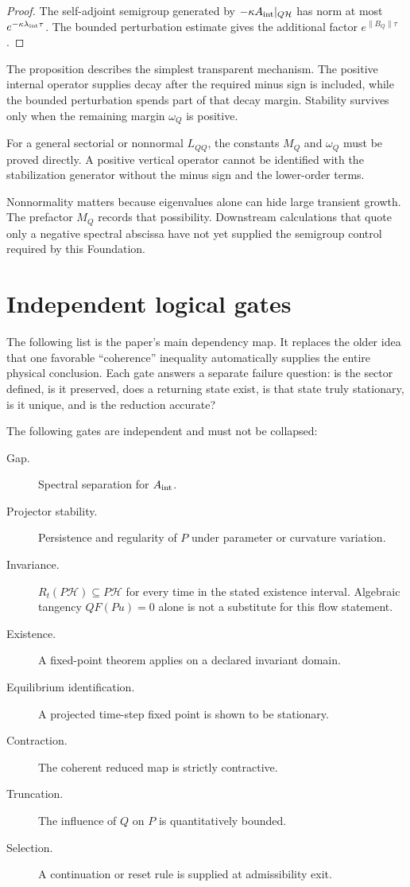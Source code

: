 \documentclass[11pt]{article}
\begin{document}
\begin{proof}
The self-adjoint semigroup generated by
$-\kappa A_{\rm int}|_{Q\mathcal H}$ has norm at most
$e^{-\kappa\lambda_{\rm int}\tau}$. The bounded perturbation estimate gives
the additional factor $e^{\|B_Q\|\tau}$.
\end{proof}

The proposition describes the simplest transparent mechanism. The positive
internal operator supplies decay after the required minus sign is included,
while the bounded perturbation spends part of that decay margin. Stability
survives only when the remaining margin $\omega_Q$ is positive.

For a general sectorial or nonnormal $L_{QQ}$, the constants $M_Q$ and
$\omega_Q$ must be proved directly. A positive vertical operator cannot be
identified with the stabilization generator without the minus sign and the
lower-order terms.

Nonnormality matters because eigenvalues alone can hide large transient
growth. The prefactor $M_Q$ records that possibility. Downstream calculations
that quote only a negative spectral abscissa have not yet supplied the
semigroup control required by this Foundation.

\section{Independent logical gates}

The following list is the paper's main dependency map. It replaces the older
idea that one favorable ``coherence'' inequality automatically supplies the
entire physical conclusion. Each gate answers a separate failure question:
is the sector defined, is it preserved, does a returning state exist, is that
state truly stationary, is it unique, and is the reduction accurate?

The following gates are independent and must not be collapsed:
\begin{description}
\item[Gap.] Spectral separation for $A_{\rm int}$.
\item[Projector stability.] Persistence and regularity of $P$ under parameter
or curvature variation.
\item[Invariance.] $R_t(P\mathcal H)\subseteq P\mathcal H$ for every
time in the stated existence interval. Algebraic tangency $QF(Pu)=0$
alone is not a substitute for this flow statement.
\item[Existence.] A fixed-point theorem applies on a declared invariant domain.
\item[Equilibrium identification.] A projected time-step fixed point is shown
to be stationary.
\item[Contraction.] The coherent reduced map is strictly contractive.
\item[Truncation.] The influence of $Q$ on $P$ is quantitatively bounded.
\item[Selection.] A continuation or reset rule is supplied at admissibility
exit.
\end{description}
\end{document}
